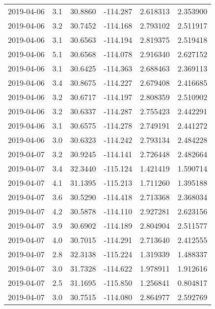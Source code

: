 \begin{tabular}{lrrrrr}
2019-04-06 &       3.1 &  30.8860 &  -114.287 &         2.618313 &         2.353900 \\
2019-04-06 &       3.2 &  30.7452 &  -114.168 &         2.793102 &         2.511917 \\
2019-04-06 &       3.1 &  30.6563 &  -114.194 &         2.819375 &         2.519418 \\
2019-04-06 &       5.1 &  30.6568 &  -114.078 &         2.916340 &         2.627152 \\
2019-04-06 &       3.1 &  30.6425 &  -114.363 &         2.688463 &         2.369113 \\
2019-04-06 &       3.4 &  30.8675 &  -114.227 &         2.679408 &         2.416685 \\
2019-04-06 &       3.2 &  30.6717 &  -114.197 &         2.808359 &         2.510902 \\
2019-04-06 &       3.2 &  30.6337 &  -114.287 &         2.755423 &         2.442291 \\
2019-04-06 &       3.1 &  30.6575 &  -114.278 &         2.749191 &         2.441272 \\
2019-04-06 &       3.0 &  30.6323 &  -114.242 &         2.793134 &         2.484228 \\
2019-04-07 &       3.2 &  30.9245 &  -114.141 &         2.726448 &         2.482664 \\
2019-04-07 &       3.4 &  32.3440 &  -115.124 &         1.421419 &         1.590714 \\
2019-04-07 &       4.1 &  31.1395 &  -115.213 &         1.711260 &         1.395188 \\
2019-04-07 &       3.6 &  30.5290 &  -114.418 &         2.713368 &         2.368034 \\
2019-04-07 &       4.2 &  30.5878 &  -114.110 &         2.927281 &         2.623156 \\
2019-04-07 &       3.9 &  30.6902 &  -114.189 &         2.804904 &         2.511577 \\
2019-04-07 &       4.0 &  30.7015 &  -114.291 &         2.713640 &         2.412555 \\
2019-04-07 &       2.8 &  32.3138 &  -115.224 &         1.319339 &         1.488337 \\
2019-04-07 &       3.0 &  31.7328 &  -114.622 &         1.978911 &         1.912616 \\
2019-04-07 &       2.5 &  31.1695 &  -115.850 &         1.256841 &         0.804817 \\
2019-04-07 &       3.0 &  30.7515 &  -114.080 &         2.864977 &         2.592769 \\

\end{tabular}
